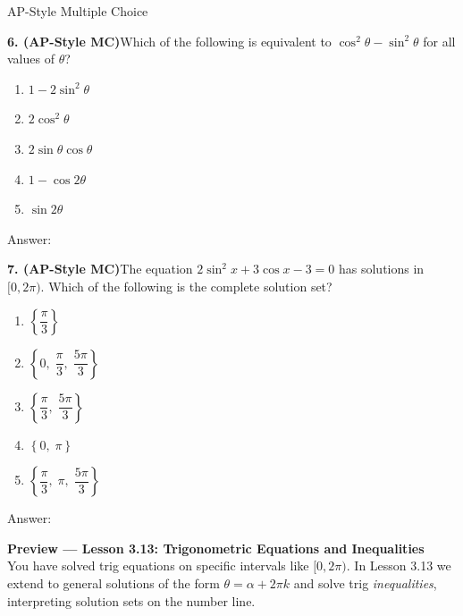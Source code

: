 \documentclass[10pt]{article}
\begin{document}
\begin{notesbox}{AP-Style Multiple Choice}

\textbf{6. (AP-Style MC)}\quad Which of the following is equivalent to
$\cos^2\theta - \sin^2\theta$ for all values of $\theta$?

\begin{enumerate}[label=(\Alph*), leftmargin=2em, itemsep=3pt]
  \item $1 - 2\sin^2\theta$
  \item $2\cos^2\theta$
  \item $2\sin\theta\cos\theta$
  \item $1 - \cos 2\theta$
  \item $\sin 2\theta$
\end{enumerate}

Answer: \underline{\hspace{1.5cm}}

\vspace{0.12in}
\textbf{7. (AP-Style MC)}\quad The equation $2\sin^2 x + 3\cos x - 3 = 0$ has
solutions in $[0, 2\pi)$. Which of the following is the complete solution set?

\begin{enumerate}[label=(\Alph*), leftmargin=2em, itemsep=3pt]
  \item $\left\{\dfrac{\pi}{3}\right\}$
  \item $\left\{0,\;\dfrac{\pi}{3},\;\dfrac{5\pi}{3}\right\}$
  \item $\left\{\dfrac{\pi}{3},\;\dfrac{5\pi}{3}\right\}$
  \item $\left\{0,\;\pi\right\}$
  \item $\left\{\dfrac{\pi}{3},\;\pi,\;\dfrac{5\pi}{3}\right\}$
\end{enumerate}

Answer: \underline{\hspace{1.5cm}}

\end{notesbox}

\vspace{0.08in}

\begin{tcolorbox}[colback=navylight, colframe=navy, arc=2mm,
    left=3mm, right=3mm, top=2mm, bottom=2mm]
\small\textbf{Preview --- Lesson 3.13: Trigonometric Equations and Inequalities}\\
You have solved trig equations on specific intervals like $[0, 2\pi)$.
In Lesson 3.13 we extend to general solutions of the form $\theta = \alpha + 2\pi k$
and solve trig \emph{inequalities}, interpreting solution sets on the number line.
\end{tcolorbox}
\end{document}
